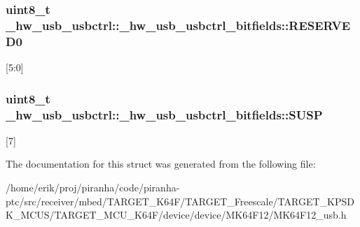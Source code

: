 \subsubsection[{\texorpdfstring{R\+E\+S\+E\+R\+V\+E\+D0}{RESERVED0}}]{\setlength{\rightskip}{0pt plus 5cm}uint8\+\_\+t \+\_\+hw\+\_\+usb\+\_\+usbctrl\+::\+\_\+hw\+\_\+usb\+\_\+usbctrl\+\_\+bitfields\+::\+R\+E\+S\+E\+R\+V\+E\+D0}\hypertarget{struct__hw__usb__usbctrl_1_1__hw__usb__usbctrl__bitfields_a4caec343f7dbb17f67dc46427681b3fe}{}\label{struct__hw__usb__usbctrl_1_1__hw__usb__usbctrl__bitfields_a4caec343f7dbb17f67dc46427681b3fe}
\mbox{[}5\+:0\mbox{]} 
\subsubsection[{\texorpdfstring{S\+U\+SP}{SUSP}}]{\setlength{\rightskip}{0pt plus 5cm}uint8\+\_\+t \+\_\+hw\+\_\+usb\+\_\+usbctrl\+::\+\_\+hw\+\_\+usb\+\_\+usbctrl\+\_\+bitfields\+::\+S\+U\+SP}\hypertarget{struct__hw__usb__usbctrl_1_1__hw__usb__usbctrl__bitfields_af63c90bffb13ef467b33c7667e3d90f3}{}\label{struct__hw__usb__usbctrl_1_1__hw__usb__usbctrl__bitfields_af63c90bffb13ef467b33c7667e3d90f3}
\mbox{[}7\mbox{]} 

The documentation for this struct was generated from the following file\+:\begin{DoxyCompactItemize}
\item 
/home/erik/proj/piranha/code/piranha-\/ptc/src/receiver/mbed/\+T\+A\+R\+G\+E\+T\+\_\+\+K64\+F/\+T\+A\+R\+G\+E\+T\+\_\+\+Freescale/\+T\+A\+R\+G\+E\+T\+\_\+\+K\+P\+S\+D\+K\+\_\+\+M\+C\+U\+S/\+T\+A\+R\+G\+E\+T\+\_\+\+M\+C\+U\+\_\+\+K64\+F/device/device/\+M\+K64\+F12/M\+K64\+F12\+\_\+usb.\+h\end{DoxyCompactItemize}
